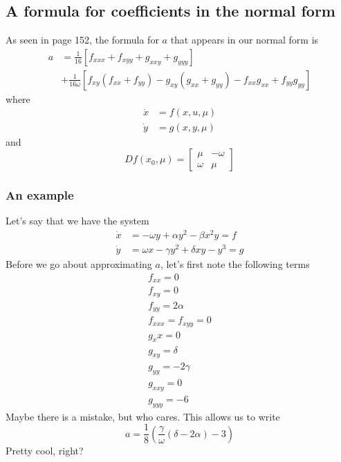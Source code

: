 \documentclass{article}
\begin{document}
\subsection{A formula for coefficients in the normal form }

As seen in page 152, the formula for $a$ that appears in our normal form is 
\begin{align*}
    a &= \frac{1}{16}\left[ f_{xxx} + f_{xyy} + g_{xxy} + g_{yyy} \right]\\
    &+ \frac{1}{16\omega}\left[ f_{xy}\left(f_{xx}+f_{yy}\right) - g_{xy}\left( g_{xx} + g_{yy} \right) -f_{xx}g_{xx} + f_{yy}g_{yy} \right]
\end{align*}
where 
\begin{align*}
    \dot{x}&= f(x,u,\mu)\\
    \dot{y}&= g(x,y,\mu)
\end{align*}
and
\[
Df(x_0,\mu)=\begin{bmatrix}
    \mu & -\omega\\ \omega & \mu
\end{bmatrix}
\]

\subsubsection{An example}
Let's say that we have the system
\begin{align*}
    \dot{x}&= -\omega y + \alpha y^2 - \beta x^2 y = f\\
    \dot{y}&= \omega x - \gamma y^2 + \delta xy-y^3=g
\end{align*}
Before we go about approximating $a$, let's first note the following terms 
\begin{gather*}
    f_{xx} =0\\
    f_{xy}=0\\
    f_{yy}=2\alpha \\
    f_{xxx}=f_{xyy} = 0\\
    g_xx=0\\
    g_{xy}=\delta\\
    g_{yy}=-2\gamma\\
    g_{xxy}=0\\
    g_{yyy}=-6
\end{gather*}
Maybe there is a mistake, but who cares. This allows us to write 
\[
a=\frac{1}{8}\left(\frac{\gamma}{\omega}\left(\delta - 2\alpha\right)-3\right)
\]
Pretty cool, right?
\end{document}

